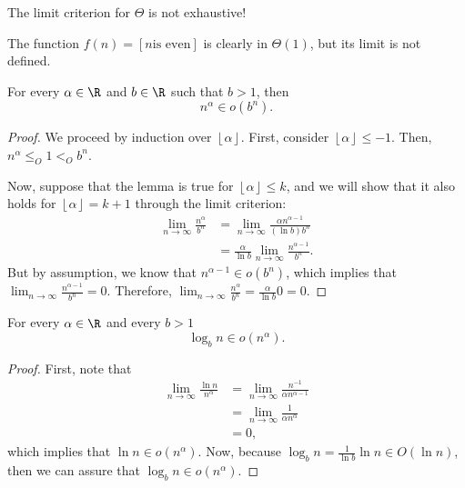 \begin{note}
    The limit criterion for $\Theta$ is not exhaustive!
\end{note}
\begin{eg}
    The function $f(n) = \left[ n \text{is even} \right] $ is clearly in $\Theta(1)$, but its limit is not defined.
\end{eg}

\begin{lemma}
    For every $\alpha\in \R$ and $b\in \R$ such that $b>1$, then \[
	n^{\alpha} \in o(b^{n})
    .\] 
\end{lemma}
\begin{proof}
    We proceed by induction over $\left\lfloor \alpha \right\rfloor$.
    First, consider $\left\lfloor \alpha \right\rfloor \le  -1$.
    Then, $n^{\alpha}\le_O 1 <_O b^{n}$.

    Now, suppose that the lemma is true for $\left\lfloor \alpha \right\rfloor\le k$, and we will show that it also holds for $\left\lfloor \alpha \right\rfloor=k+1$ through the limit criterion:
    \begin{align*}
        \lim_{n \to \infty} \frac{n^{\alpha}}{b^{n}} &= \lim_{n \to \infty} \frac{\alpha n^{\alpha-1}}{(\ln b)b^{n}} \\
	&= \frac{\alpha}{\ln b} \lim_{n \to \infty} \frac{n^{\alpha-1}}{b^{n}}
    .\end{align*}
    But by assumption, we know that $n^{\alpha-1}\in o(b^{n})$, which implies that $\lim_{n \to \infty} \frac{n^{\alpha-1}}{b^{n}} = 0$.
    Therefore, $\lim_{n \to \infty} \frac{n^{\alpha}}{b^{n}} = \frac{\alpha}{\ln b} 0 = 0$.
\end{proof}

\begin{lemma}
    For every $\alpha \in \R$ and every $b>1$ \[
    \log_b n \in o(n^{\alpha})
    .\] 
\end{lemma}
\begin{proof}
    First, note that
    \begin{align*}
        \lim_{n \to \infty} \frac{\ln n}{n^{\alpha}} &= \lim_{n \to \infty} \frac{n^{-1}}{\alpha n^{\alpha-1}} \\
	&= \lim_{n \to \infty} \frac{1}{\alpha n^{\alpha}} \\
	&= 0
    ,\end{align*}
    which implies that $\ln n \in o(n^{\alpha})$.
    Now, because $\log_b n = \frac{1}{\ln b} \ln n \in O(\ln n)$, then we can assure that $\log_b n \in o(n^{\alpha})$.
\end{proof}

